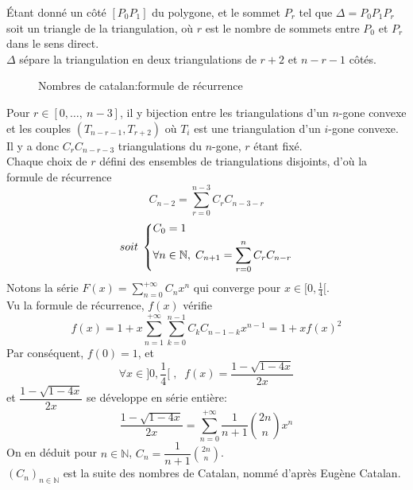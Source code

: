 \documentclass[10pt,a4paper]{article}
\begin{document}
			Étant donné un côté $[P_{0}P_{1}]$ du polygone, et le sommet $P_{r}$ tel que $\Delta = P_{0}P_{1}P_{r}$ soit un triangle de la triangulation, où $r$ est le nombre de sommets entre $P_{0}$ et $P_{r}$ dans le sens direct.\\
			$\Delta$ sépare la triangulation en deux triangulations de $r+2$ et $n-r-1$ côtés.\\
			\begin{figure}[h]
				\centering
				\caption{Nombres de catalan:formule de récurrence}
			\end{figure}
			Pour $r\in [0,\ldots,\:n-3]$, il y bijection entre les triangulations d'un $n$-gone convexe et les couples $(T_{n-r-1},T_{r+2})$ où $T_{i}$ est une triangulation d'un $i$-gone convexe.\\
			Il y a donc $C_{r}C_{n-r-3}$ triangulations du $n$-gone, $r$ étant fixé.\\
			Chaque choix de $r$ défini des ensembles de triangulations disjoints, d'où la formule de récurrence
			\[C_{n-2} = \sum_{r=0}^{n-3}{C_{r}C_{n-3-r}}\] 
			\[soit\;
				\begin{dcases*}
		        C_{0} = 1\\
		        \forall n\in\mathbb{N},\; C_{n+1} = \sum_{r=0}^{n}{C_{r}C_{n-r}}
		        \end{dcases*}
			\]
			Notons la série $F(x) = \sum\limits_{n=0}^{+\infty}{C_{n}x^{n}}$ qui converge pour $x\in[0,\frac{1}{4}[$.\\
			Vu la formule de récurrence, $f(x)$ vérifie
			$$f(x) = 1+x\sum_{n=1}^{+\infty}{\sum_{k=0}^{n-1}{C_{k}C_{n-1-k}x^{n-1}}} = 1+xf(x)^{2}$$
			Par conséquent, $f(0)=1$, et $$\forall x\in]0,\frac{1}{4}[\;,\;\;
			f(x) = \dfrac{1-\sqrt{1-4x}}{2x}$$
			et $\dfrac{1-\sqrt{1-4x}}{2x}$ se développe en série entière:
			$$\dfrac{1-\sqrt{1-4x}}{2x} = \sum_{n=0}^{+\infty}{\dfrac{1}{n+1}\binom{2n}{n}x^{n}}$$
			On en déduit pour $n\in\mathbb{N}$, $C_{n} = \dfrac{1}{n+1}\displaystyle\binom{2n}{n}$.\\
			$(C_{n})_{n\in\mathbb{N}}$ est la suite des nombres de Catalan, nommé d'après Eugène Catalan.
			

		
		
\end{document}
